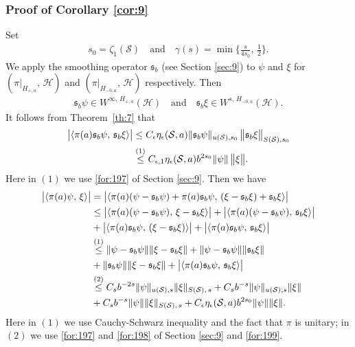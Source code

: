 \documentclass[11 pt]{amsart}
\newcommand{\norm}[1]{\lVert#1\rVert}
\theoremstyle{definition}
\numberwithin{equation}{section}
\begin{document}
\subsubsection{Proof of Corollary \ref{cor:9}} Set
\begin{align}\label{for:363}
 s_0=\zeta_1(\mathcal{S})\quad\text{and}\quad \gamma(s)=\min\!\Big\{\frac{s}{4s_0},\,\frac{1}{2}\Big\}.
\end{align}
We apply the smoothing operator $\mathfrak{s}_b$ (see Section \ref{sec:9}) to $\psi$ and $\xi$ for $(\pi|_{H_{+,a}},\,\mathcal{H})$ and $(\pi|_{H_{-0,a}},\,\mathcal{H})$ respectively. Then
 \begin{align*}
  \mathfrak{s}_b \psi\in W^{\infty,\,H_{+,a}}(\mathcal H)\quad\text{and}\quad \mathfrak{s}_b\xi\in W^{s,\,H_{-0,a}}(\mathcal H).
 \end{align*}
 It follows from Theorem~\ref{th:7} that
\begin{align}\label{for:199}
 \big|\langle \pi(a)\mathfrak{s}_b\psi,\, \mathfrak{s}_b\xi\rangle\big|&\leq C_\epsilon \eta_\epsilon(\mathcal{S}, a)\norm{\mathfrak{s}_b\psi}_{u(\mathcal{S}),s_0}\,\big\|\mathfrak{s}_b\xi\big\|_{S(\mathcal{S}),s_0}\notag\\
 &\overset{\text{(1)}}{\leq} C_{\epsilon,1} \eta_\epsilon(\mathcal{S}, a)b^{2s_0}\norm{\psi}\,\big\|\xi\big\|.
\end{align}
Here in $(1)$ we use \eqref{for:197} of Section \ref{sec:9}. Then we have
\begin{align*}
\big|\langle \pi(a)\psi, \,\xi\rangle\big|&=\big|\langle \pi(a)(\psi-\mathfrak{s}_b\psi)+\pi(a)\mathfrak{s}_b\psi, \,(\xi-\mathfrak{s}_b\xi)+\mathfrak{s}_b\xi\rangle\big|\notag\\
&\leq \big|\langle \pi(a)(\psi-\mathfrak{s}_b\psi), \,\xi-\mathfrak{s}_b\xi\rangle\big|+\big|\langle \pi(a)(\psi-\mathfrak{s}_b\psi), \,\mathfrak{s}_b\xi\rangle\big|\notag\\
&+\big|\langle \pi(a)\mathfrak{s}_b\psi, \,(\xi-\mathfrak{s}_b\xi)\rangle\big|+\big|\langle \pi(a)\mathfrak{s}_b\psi, \,\mathfrak{s}_b\xi\rangle\big|\notag\\
&\overset{\text{(1)}}{\leq} \|\psi-\mathfrak{s}_b\psi\|\|\xi-\mathfrak{s}_b\xi\|+\|\psi-\mathfrak{s}_b\psi\| \|\mathfrak{s}_b\xi\|\notag\\
&+\|\mathfrak{s}_b\psi\| \|\xi-\mathfrak{s}_b\xi\|+\big|\langle \pi(a)\mathfrak{s}_b\psi, \,\mathfrak{s}_b\xi\rangle\big|\notag\\
&\overset{\text{(2)}}{\leq}C_sb^{-2s}\|\psi\|_{u(\mathcal{S}),s}\norm{\xi}_{S(\mathcal{S}),\,s}+C_sb^{-s}\|\psi\|_{u(\mathcal{S}),s}\norm{\xi}\notag\\
&+C_sb^{-s}\|\psi\|\norm{\xi}_{S(\mathcal{S}),\,s}+C_\epsilon \eta_\epsilon(\mathcal{S}, a) b^{2s_0}\|\psi\|\norm{\xi}.
\end{align*}
Here in $(1)$ we use Cauchy-Schwarz inequality and the fact that $\pi$ is unitary; in $(2)$ we use \eqref{for:197} and \eqref{for:198} of Section \ref{sec:9}  and \eqref{for:199}.
\end{document}
